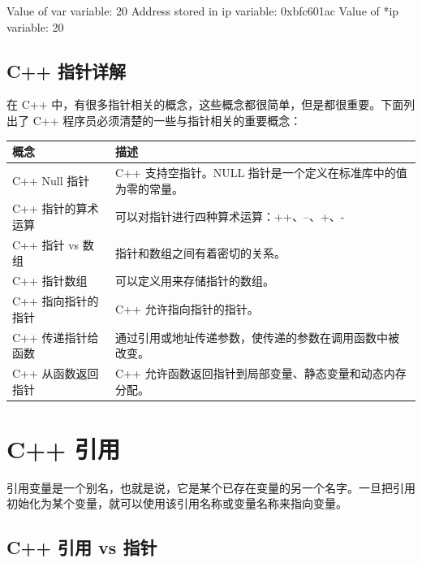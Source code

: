 \documentclass[
]{article}
\newenvironment{Shaded}{}{}
\newcommand{\BaseNTok}[1]{\textcolor[rgb]{0.25,0.63,0.44}{#1}}
\newcommand{\DecValTok}[1]{\textcolor[rgb]{0.25,0.63,0.44}{#1}}
\newcommand{\NormalTok}[1]{#1}
\newcommand{\OperatorTok}[1]{\textcolor[rgb]{0.40,0.40,0.40}{#1}}
\begin{document}
\begin{Shaded}
\begin{Highlighting}[]
\NormalTok{Value of var variable}\OperatorTok{:} \DecValTok{20}
\NormalTok{Address stored in ip variable}\OperatorTok{:} \BaseNTok{0xbfc601ac}
\NormalTok{Value of }\OperatorTok{*}\NormalTok{ip variable}\OperatorTok{:} \DecValTok{20}
\end{Highlighting}
\end{Shaded}

\hypertarget{c-ux6307ux9488ux8be6ux89e3}{%
\subsection{C++ 指针详解}\label{c-ux6307ux9488ux8be6ux89e3}}

在 C++
中，有很多指针相关的概念，这些概念都很简单，但是都很重要。下面列出了 C++
程序员必须清楚的一些与指针相关的重要概念：

\begin{longtable}[]{@{}ll@{}}
\toprule
概念 & 描述 \\
\midrule
\endhead
C++ Null 指针 & C++ 支持空指针。NULL
指针是一个定义在标准库中的值为零的常量。 \\
C++ 指针的算术运算 & 可以对指针进行四种算术运算：++、--、+、- \\
C++ 指针 vs 数组 & 指针和数组之间有着密切的关系。 \\
C++ 指针数组 & 可以定义用来存储指针的数组。 \\
C++ 指向指针的指针 & C++ 允许指向指针的指针。 \\
C++ 传递指针给函数 &
通过引用或地址传递参数，使传递的参数在调用函数中被改变。 \\
C++ 从函数返回指针 & C++
允许函数返回指针到局部变量、静态变量和动态内存分配。 \\
\bottomrule
\end{longtable}

\hypertarget{c-ux5f15ux7528}{%
\section{C++ 引用}\label{c-ux5f15ux7528}}

引用变量是一个别名，也就是说，它是某个已存在变量的另一个名字。一旦把引用初始化为某个变量，就可以使用该引用名称或变量名称来指向变量。

\hypertarget{c-ux5f15ux7528-vs-ux6307ux9488}{%
\subsection{C++ 引用 vs 指针}\label{c-ux5f15ux7528-vs-ux6307ux9488}}
\end{document}
